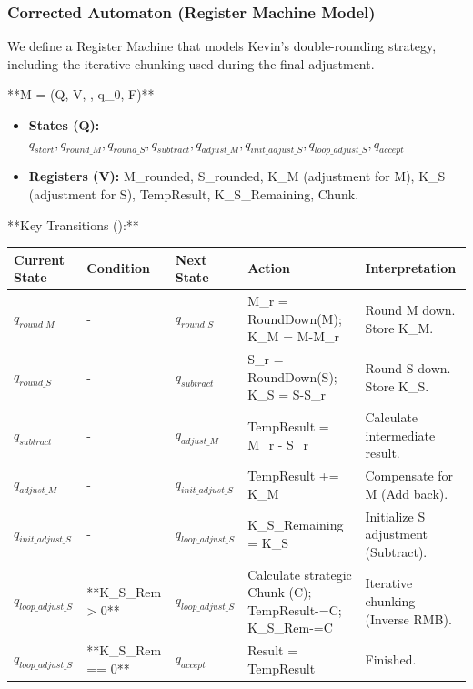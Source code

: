 \documentclass[11pt]{article}
\begin{document}
 







\subsubsection*{Corrected Automaton (Register Machine Model)}

We define a Register Machine that models Kevin's double-rounding strategy, including the iterative chunking used during the final adjustment.

**M = (Q, V, \delta, q_0, F)**

\begin{itemize}
    \item \textbf{States (Q):} {$q_{start}, q_{round\_M}, q_{round\_S}, q_{subtract}, q_{adjust\_M}, q_{init\_adjust\_S}, q_{loop\_adjust\_S}, q_{accept}$}
    \item \textbf{Registers (V):} M\_rounded, S\_rounded, K\_M (adjustment for M), K\_S (adjustment for S), TempResult, K\_S\_Remaining, Chunk.
\end{itemize}

**Key Transitions (\delta):**

\begin{longtable}{|l|l|l|l|l|}
\hline
\textbf{Current State} & \textbf{Condition} & \textbf{Next State} & \textbf{Action} & \textbf{Interpretation} \\
\hline
\endhead
$q_{round\_M}$ & - & $q_{round\_S}$ & M\_r = RoundDown(M); K\_M = M-M\_r & Round M down. Store K\_M. \\
\hline
$q_{round\_S}$ & - & $q_{subtract}$ & S\_r = RoundDown(S); K\_S = S-S\_r & Round S down. Store K\_S. \\
\hline
$q_{subtract}$ & - & $q_{adjust\_M}$ & TempResult = M\_r - S\_r & Calculate intermediate result. \\
\hline
$q_{adjust\_M}$ & - & $q_{init\_adjust\_S}$ & TempResult += K\_M & Compensate for M (Add back). \\
\hline
$q_{init\_adjust\_S}$ & - & $q_{loop\_adjust\_S}$ & K\_S\_Remaining = K\_S & Initialize S adjustment (Subtract). \\
\hline
$q_{loop\_adjust\_S}$ & **K\_S\_Rem > 0** & $q_{loop\_adjust\_S}$ & Calculate strategic Chunk (C); TempResult-=C; K\_S\_Rem-=C & Iterative chunking (Inverse RMB). \\
\hline
$q_{loop\_adjust\_S}$ & **K\_S\_Rem == 0** & $q_{accept}$ & Result = TempResult & Finished. \\
\hline
\end{longtable}
\end{document}
